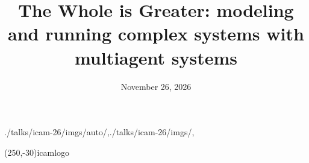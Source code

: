 

\date{November 26, 2026}

\title{The Whole is Greater: modeling and running complex systems with multiagent systems}



\usefootlinewithsections

\begin{graphicspathcontext}{{./talks/icam-26/imgs/auto/},{./talks/icam-26/imgs/},\old}

	\settitlepagerightfigure(250,-30){icamlogo}

\end{graphicspathcontext}





\OECDAItrue
\EUAIActfalse

\AtBeginSection{%
	\sectiontableofcontentslide%
}

\endinput

